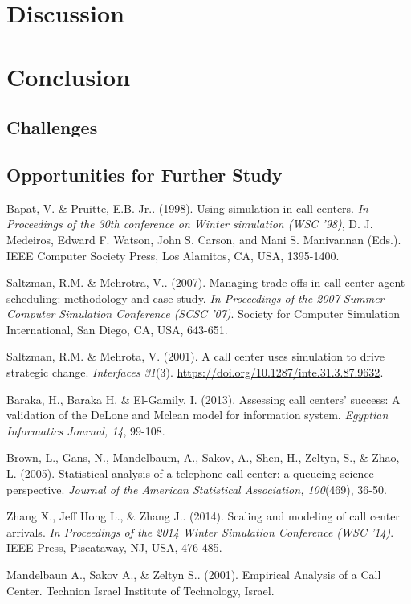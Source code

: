 \documentclass[12pt,twocolumn]{article}
\begin{document}
\section{Discussion}


\section{Conclusion}

	\subsection{Challenges}

	\subsection{Opportunities for Further Study}














\newpage
\clearpage
{}
\begin{thebibliography}{7}
	
	Bapat, V. \& Pruitte, E.B. Jr.. (1998). Using simulation in call centers. \textit{In Proceedings of the 30th conference on Winter simulation (WSC '98)}, D. J. Medeiros, Edward F. Watson, John S. Carson, and Mani S. Manivannan (Eds.). IEEE Computer Society Press, Los Alamitos, CA, USA, 1395-1400.
	
	Saltzman, R.M. \& Mehrotra, V.. (2007). Managing trade-offs in call center agent scheduling: methodology and case study. \textit{In Proceedings of the 2007 Summer Computer Simulation Conference (SCSC '07)}. Society for Computer Simulation International, San Diego, CA, USA, 643-651.
	
	Saltzman, R.M. \& Mehrota, V. (2001). A call center uses simulation to drive strategic change. \textit{Interfaces 31}(3). \href{https://doi.org/10.1287/inte.31.3.87.9632}{https://doi.org/10.1287/inte.31.3.87.9632}. 
	
	
	Baraka, H., Baraka H. \& El-Gamily, I. (2013). Assessing call centers' success: A validation of the DeLone and Mclean model for information system. \textit{Egyptian Informatics Journal, 14}, 99-108.

	Brown, L., Gans, N., Mandelbaum, A., Sakov, A., Shen, H., Zeltyn, S., \& Zhao, L. (2005). Statistical analysis of a telephone call center: a queueing-science perspective. \textit{Journal of the American Statistical Association, 100}(469), 36-50.

	Zhang X., Jeff Hong L., \& Zhang J.. (2014). Scaling and modeling of call center arrivals. \textit{In Proceedings of the 2014 Winter Simulation Conference (WSC '14)}. IEEE Press, Piscataway, NJ, USA, 476-485.

	Mandelbaun A., Sakov A., \& Zeltyn S.. (2001). Empirical Analysis of a Call Center. Technion Israel Institute of Technology, Israel.

\end{thebibliography}
\end{document}
